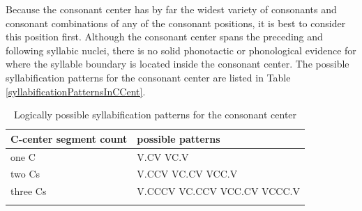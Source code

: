 Because the consonant center has by far the widest variety of consonants and consonant combinations of any of the consonant positions, it is best to consider this position first. 
Although the consonant center spans the preceding and following syllabic nuclei, there is no solid phonotactic or phonological evidence for where the syllable boundary is located inside the consonant center. 
The possible syllabification patterns for the consonant center are listed in Table \vref{syllabificationPatternsInCCent}. 
\newcommand{\HSP}{\hspace*{4pt}}%
\begin{table}[h]\centering
\caption{Logically possible syllabification patterns for the consonant center}\label{syllabificationPatternsInCCent}
\begin{tabular}{ll}\mytoprule%
{C-center segment count}	&{possible patterns} \\\hline
one C	& V.CV \HSP VC.V \\%
two Cs	& V.CCV \HSP VC.CV \HSP VCC.V \\
three Cs	& V.CCCV \HSP VC.CCV \HSP VCC.CV \HSP VCCC.V \\\mybottomrule
\end{tabular}
\end{table}

